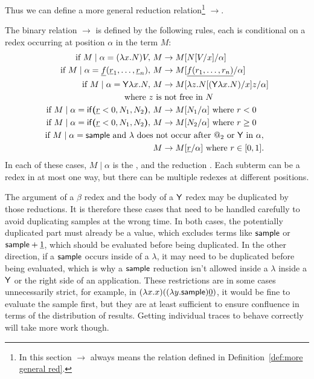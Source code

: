 Thus we can define a more general reduction relation\footnote{In this section $\to$ always means the relation defined in Definition~\ref{def:more general red}.} $\to$.

\begin{definition}\rm
\label{def:more general red}
The binary relation $\to$ is defined by the following rules, each is conditional on a redex occurring at position $\alpha$ in the term $M$:
\begin{align*}
  \text{if } M \mid \alpha = (\lambda x.N) V,\ & M \to M[N[V/x]/\alpha] \\
  \text{if } M \mid \alpha = \underline f (\underline r_1, \dots , \underline r_n),\ & M \to M[\underline{f(r_1,\dots,r_n)}/\alpha] \\
  \text{if } M \mid \alpha = \mathsf{Y} \lambda x. N,\ & M \to M[\lambda z. N[(\mathsf{Y} \lambda x. N)/x] z/\alpha]\\ \text{where }z&\text{ is not free in $N$}\\
  \text{if } M \mid \alpha = \mathsf{if}\boldsymbol{(}\underline r < 0, N_1, N_2\boldsymbol{)},\ & M \to M[N_1/\alpha] \text{ where }r < 0 \\
  \text{if } M \mid \alpha = \mathsf{if}\boldsymbol{(}\underline r < 0, N_1, N_2\boldsymbol{)},\ & M \to M[N_2/\alpha] \text{ where }r \geq 0 \\
  \text{if } M \mid \alpha = \mathsf{sample} \text{ and $\lambda$ does}&\text{ not occur after $@_2$ or $\mathsf{Y}$ in $\alpha$},\\ & M \to M[\underline r/\alpha] \text{ where } r \in [0,1].
\end{align*}
In each of these cases, $M \mid \alpha$ is the , and the reduction . Each subterm can be a redex in at most one way, but there can be multiple redexes at different positions.
\end{definition}

The argument of a $\beta$ redex and the body of a $\mathsf{Y}$ redex may be duplicated by those reductions. It is therefore these cases that need to be handled carefully to avoid duplicating samples at the wrong time. In both cases, the potentially duplicated part must already be a value, which excludes terms like $\mathsf{sample}$ or $\mathsf{sample} + \underline 1$, which should be evaluated before being duplicated. In the other direction, if a $\mathsf{sample}$ occurs inside of a $\lambda$, it may need to be duplicated before being evaluated, which is why a $\mathsf{sample}$ reduction isn't allowed inside a $\lambda$ inside a $\mathsf{Y}$ or the right side of an application. These restrictions are in some cases unnecessarily strict, for example, in $(\lambda x. x) ((\lambda y. \mathsf{sample}) \underline 0)$, it would be fine to evaluate the sample first, but they are at least sufficient to ensure confluence in terms of the distribution of results. Getting individual traces to behave correctly will take more work though.

